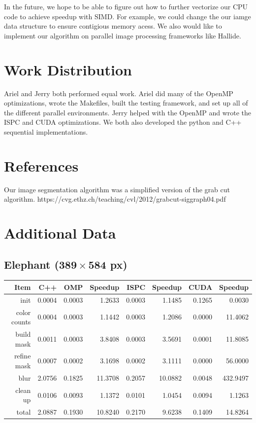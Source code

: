 \documentclass[12pt]{article}
\begin{document}
In the future, we hope to be able to figure out how to further vectorize our
CPU code to achieve speedup with SIMD. For example, we could change the
our iamge data structure to ensure contigious memory acess. We also would like
to implement our algorithm on parallel image processing frameworks like Hallide.

\section{Work Distribution}
Ariel and Jerry both performed equal work. Ariel did many of the OpenMP
optimizations, wrote the Makefiles, built the testing framework, and set up
all of the different parallel environments. Jerry helped with the OpenMP and
wrote the ISPC and CUDA optimizations. We both also developed the python and
C++ sequential implementations.

\section{References}
Our image segmentation algorithm was a simplified version of the grab cut
algorithm.
https://cvg.ethz.ch/teaching/cvl/2012/grabcut-siggraph04.pdf

\section{Additional Data}
\subsection{Elephant ($\mathbf{389 \times 584}$ px)}

\begin{tabular}{r|r|r|r|r|r|r|r}
    Item & C++ & OMP & Speedup & ISPC & Speedup & CUDA & Speedup
\\  \hline
    init & 0.0004 & 0.0003 & 1.2633 & 0.0003 & 1.1485 & 0.1265 & 0.0030
\\  color counts & 0.0004 & 0.0003 & 1.1442 & 0.0003 & 1.2086 & 0.0000 & 11.4062
\\  build mask & 0.0011 & 0.0003 & 3.8408 & 0.0003 & 3.5691 & 0.0001 & 11.8085
\\  refine mask & 0.0007 & 0.0002 & 3.1698 & 0.0002 & 3.1111 & 0.0000 & 56.0000
\\  blur & 2.0756 & 0.1825 & 11.3708 & 0.2057 & 10.0882 & 0.0048 & 432.9497
\\  clean up & 0.0106 & 0.0093 & 1.1372 & 0.0101 & 1.0454 & 0.0094 & 1.1263
\\  \hline
    total & 2.0887 & 0.1930 & 10.8240 & 0.2170 & 9.6238 & 0.1409 & 14.8264
\end{tabular}
\end{document}

